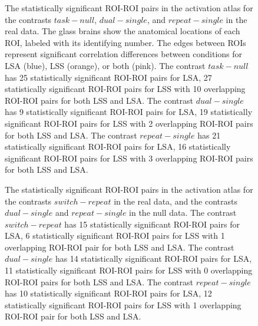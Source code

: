 \documentclass[phd,figures,tables,ackpage,abstractpage,publicabstractpage]{uithesis}
\begin{document}
\begin{figure}[H]
  \centering



  \caption[All contrasts for all atlases for all data...]{
   The statistically significant ROI-ROI pairs in the activation atlas for the contrasts $task - null$, $dual - single$,
   and $repeat - single$ in the real data.
   The glass brains show the anatomical locations of each ROI,
   labeled with its identifying number.
   The edges between ROIs represent significant correlation differences
   between conditions for LSA (blue), LSS (orange), or both (pink).
   The contrast $task - null$ has 25 statistically significant ROI-ROI
   pairs for LSA, 27 statistically significant ROI-ROI pairs
   for LSS with 10 overlapping ROI-ROI pairs for both LSS and LSA.
   The contrast $dual - single$ has 9 statistically significant ROI-ROI
   pairs for LSA, 19 statistically significant ROI-ROI pairs
   for LSS with 2 overlapping ROI-ROI pairs for both LSS and LSA.
   The contrast $repeat - single$ has 21 statistically significant ROI-ROI
   pairs for LSA, 16 statistically significant ROI-ROI pairs
   for LSS with 3 overlapping ROI-ROI pairs for both LSS and LSA.
  }
  \label{fig:significant-contrasts1}
\end{figure}

\begin{figure}[H]
  \ContinuedFloat
  \centering



  \caption[All contrasts for all atlases for all data continued...]{
      The statistically significant ROI-ROI pairs in the activation atlas for the contrasts
      $switch - repeat$ in the real data, and the contrasts $dual - single$ and $repeat - single$
      in the null data.
      The contrast $switch - repeat$ has 15 statistically significant ROI-ROI
      pairs for LSA, 6 statistically significant ROI-ROI pairs
      for LSS with 1 overlapping ROI-ROI pair for both LSS and LSA.
      The contrast $dual - single$ has 14 statistically significant ROI-ROI
      pairs for LSA, 11 statistically significant ROI-ROI pairs
      for LSS with 0 overlapping ROI-ROI pairs for both LSS and LSA.
      The contrast $repeat - single$ has 10 statistically significant ROI-ROI
      pairs for LSA, 12 statistically significant ROI-ROI pairs
      for LSS with 1 overlapping ROI-ROI pair for both LSS and LSA.
  }
  \label{fig:significant-contrasts2}
\end{figure}
\end{document}
